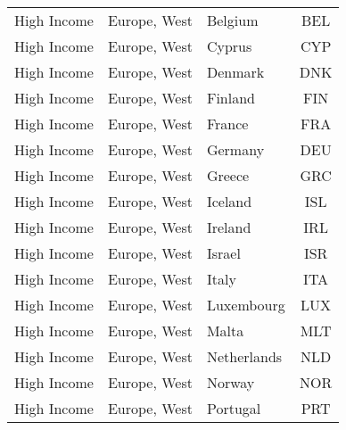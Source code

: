 \begin{landscape}
\begin{longtable}{|c|c|p{5cm}|c|}
                   High Income &                 Europe, West &                                           Belgium &  BEL \\
                   High Income &                 Europe, West &                                            Cyprus &  CYP \\
                   High Income &                 Europe, West &                                           Denmark &  DNK \\
                   High Income &                 Europe, West &                                           Finland &  FIN \\
                   High Income &                 Europe, West &                                            France &  FRA \\
                   High Income &                 Europe, West &                                           Germany &  DEU \\
                   High Income &                 Europe, West &                                            Greece &  GRC \\
                   High Income &                 Europe, West &                                           Iceland &  ISL \\
                   High Income &                 Europe, West &                                           Ireland &  IRL \\
                   High Income &                 Europe, West &                                            Israel &  ISR \\
                   High Income &                 Europe, West &                                             Italy &  ITA \\
                   High Income &                 Europe, West &                                        Luxembourg &  LUX \\
                   High Income &                 Europe, West &                                             Malta &  MLT \\
                   High Income &                 Europe, West &                                       Netherlands &  NLD \\
                   High Income &                 Europe, West &                                            Norway &  NOR \\
                   High Income &                 Europe, West &                                          Portugal &  PRT \\

\end{longtable}
\end{landscape}
